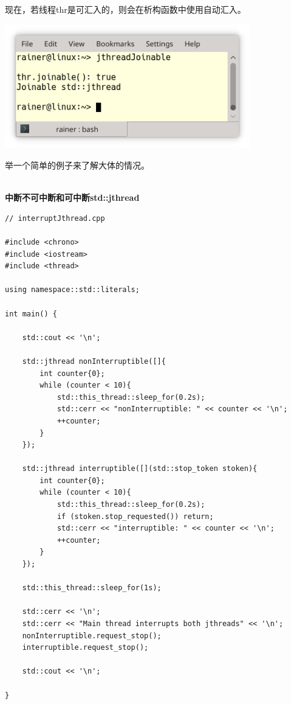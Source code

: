 现在，若线程thr是可汇入的，则会在析构函数中使用自动汇入。

\begin{center}
\includegraphics[width=0.8\textwidth]{content/3/chapter6/images/26.png}\\
\end{center}


举一个简单的例子来了解大体的情况。

\hspace*{\fill} \\ %
\noindent
\textbf{中断不可中断和可中断std::jthread}
\begin{lstlisting}[style=styleCXX]
// interruptJthread.cpp

#include <chrono>
#include <iostream>
#include <thread>

using namespace::std::literals;

int main() {

	std::cout << '\n';
	
	std::jthread nonInterruptible([]{
		int counter{0};
		while (counter < 10){
			std::this_thread::sleep_for(0.2s);
			std::cerr << "nonInterruptible: " << counter << '\n';
			++counter;
		}
	});
	
	std::jthread interruptible([](std::stop_token stoken){
		int counter{0};
		while (counter < 10){
			std::this_thread::sleep_for(0.2s);
			if (stoken.stop_requested()) return;
			std::cerr << "interruptible: " << counter << '\n';
			++counter;
		}
	});
	
	std::this_thread::sleep_for(1s);
	
	std::cerr << '\n';
	std::cerr << "Main thread interrupts both jthreads" << '\n';
	nonInterruptible.request_stop();
	interruptible.request_stop();
	
	std::cout << '\n';

}
\end{lstlisting}

